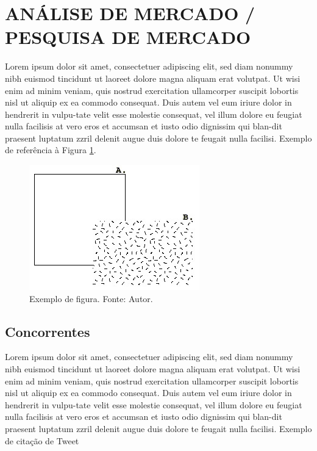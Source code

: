 \section{ANÁLISE DE MERCADO / PESQUISA DE MERCADO}
\label{secao:analise_pesquisa_de_mercado}
Lorem ipsum dolor sit amet, consectetuer adipiscing elit, sed diam nonummy nibh euismod tincidunt ut laoreet dolore magna aliquam erat volutpat. Ut wisi enim ad minim veniam, quis nostrud exercitation ullamcorper suscipit lobortis nisl ut aliquip ex ea commodo consequat. Duis autem vel eum iriure dolor in hendrerit in vulpu-tate velit esse molestie consequat, vel illum dolore eu feugiat nulla facilisis at vero eros et accumsan et iusto odio dignissim qui blan-dit praesent luptatum zzril delenit augue duis dolore te feugait nulla facilisi.
Exemplo de referência à Figura \ref{figura:exemplo}.

\begin{figure}[htb]
  \includegraphics[width=0.8\columnwidth]{figure.jpg}
  \centering
  \caption{Exemplo de figura. Fonte: Autor.}
  \label{figura:exemplo}
\end{figure}

\subsection{Concorrentes}
\label{secao:concorrentes}
Lorem ipsum dolor sit amet, consectetuer adipiscing elit, sed diam nonummy nibh euismod tincidunt ut laoreet dolore magna aliquam erat volutpat. Ut wisi enim ad minim veniam, quis nostrud exercitation ullamcorper suscipit lobortis nisl ut aliquip ex ea commodo consequat. Duis autem vel eum iriure dolor in hendrerit in vulpu-tate velit esse molestie consequat, vel illum dolore eu feugiat nulla facilisis at vero eros et accumsan et iusto odio dignissim qui blan-dit praesent luptatum zzril delenit augue duis dolore te feugait nulla facilisi.
Exemplo de citação de Tweet \cite{stacey2011}

